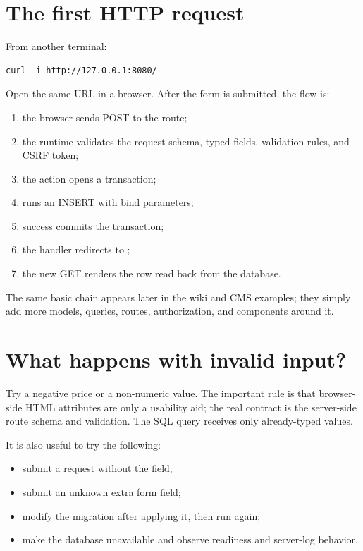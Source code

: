 \section{The first HTTP request}

From another terminal:

\begin{lstlisting}
curl -i http://127.0.0.1:8080/
\end{lstlisting}

Open the same URL in a browser. After the form is submitted, the flow is:

\begin{enumerate}
  \item the browser sends POST to the  route;
  \item the runtime validates the request schema, typed fields, validation rules, and CSRF token;
  \item the  action opens a transaction;
  \item {} runs an INSERT with bind parameters;
  \item success commits the transaction;
  \item the handler redirects to \code{/};
  \item the new GET renders the row read back from the database.
\end{enumerate}

The same basic chain appears later in the wiki and CMS examples; they simply add more models, queries, routes, authorization, and components around it.

\section{What happens with invalid input?}

Try a negative price or a non-numeric value. The important rule is that browser-side HTML attributes are only a usability aid; the real contract is the server-side route schema and validation. The SQL query receives only already-typed values.

It is also useful to try the following:

\begin{itemize}
  \item submit a request without the  field;
  \item submit an unknown extra form field;
  \item modify the migration after applying it, then run  again;
  \item make the database unavailable and observe readiness and server-log behavior.
\end{itemize}

